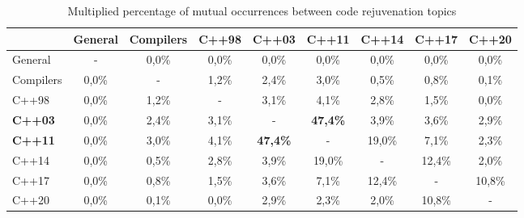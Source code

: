 \begin{table}
\caption{Multiplied percentage of mutual occurrences between code rejuvenation topics}
  \label{tab:mut_occurr_mux}
\begin{tabular}{@{}lcccccccc@{}}
\toprule
                                    & \multicolumn{1}{l}{General} & \multicolumn{1}{l}{Compilers} & \multicolumn{1}{l}{C++98} & \multicolumn{1}{l}{\textbf{C++03}} & \multicolumn{1}{l}{\textbf{C++11}} & \multicolumn{1}{l}{C++14} & \multicolumn{1}{l}{C++17} & \multicolumn{1}{l}{C++20} \\ \midrule
\multicolumn{1}{l|}{General}        & -                           & 0,0\%                         & 0,0\%                     & 0,0\%                              & 0,0\%                              & 0,0\%                     & 0,0\%                     & 0,0\%                     \\
\multicolumn{1}{l|}{Compilers}      & 0,0\%                       & -                             & 1,2\%                     & 2,4\%                              & 3,0\%                              & 0,5\%                     & 0,8\%                     & 0,1\%                     \\
\multicolumn{1}{l|}{C++98}          & 0,0\%                       & 1,2\%                         & -                         & 3,1\%                              & 4,1\%                              & 2,8\%                     & 1,5\%                     & 0,0\%                     \\
\multicolumn{1}{l|}{\textbf{C++03}} & 0,0\%                       & 2,4\%                         & 3,1\%                     & -                                  & \textbf{47,4\%}                    & 3,9\%                     & 3,6\%                     & 2,9\%                     \\
\multicolumn{1}{l|}{\textbf{C++11}} & 0,0\%                       & 3,0\%                         & 4,1\%                     & \textbf{47,4\%}                    & -                                  & 19,0\%                    & 7,1\%                     & 2,3\%                     \\
\multicolumn{1}{l|}{C++14}          & 0,0\%                       & 0,5\%                         & 2,8\%                     & 3,9\%                              & 19,0\%                             & -                         & 12,4\%                    & 2,0\%                     \\
\multicolumn{1}{l|}{C++17}          & 0,0\%                       & 0,8\%                         & 1,5\%                     & 3,6\%                              & 7,1\%                              & 12,4\%                    & -                         & 10,8\%                    \\
\multicolumn{1}{l|}{C++20}          & 0,0\%                       & 0,1\%                         & 0,0\%                     & 2,9\%                              & 2,3\%                              & 2,0\%                     & 10,8\%                    & -                         \\ \bottomrule
\end{tabular}
\end{table}


